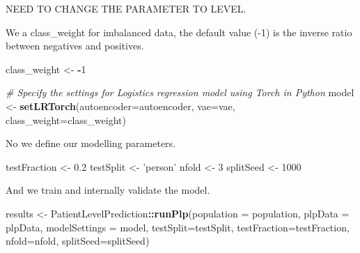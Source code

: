 \documentclass[]{article}
\newenvironment{Shaded}{\begin{snugshade}}{\end{snugshade}}
\newcommand{\KeywordTok}[1]{\textcolor[rgb]{0.13,0.29,0.53}{\textbf{#1}}}
\newcommand{\DataTypeTok}[1]{\textcolor[rgb]{0.13,0.29,0.53}{#1}}
\newcommand{\DecValTok}[1]{\textcolor[rgb]{0.00,0.00,0.81}{#1}}
\newcommand{\FloatTok}[1]{\textcolor[rgb]{0.00,0.00,0.81}{#1}}
\newcommand{\StringTok}[1]{\textcolor[rgb]{0.31,0.60,0.02}{#1}}
\newcommand{\CommentTok}[1]{\textcolor[rgb]{0.56,0.35,0.01}{\textit{#1}}}
\newcommand{\OperatorTok}[1]{\textcolor[rgb]{0.81,0.36,0.00}{\textbf{#1}}}
\newcommand{\NormalTok}[1]{#1}
\begin{document}
NEED TO CHANGE THE PARAMETER TO LEVEL.

We a class\_weight for imbalanced data, the default value (-1) is the
inverse ratio between negatives and positives.

\begin{Shaded}
\begin{Highlighting}[]
\NormalTok{class_weight <-}\StringTok{ }\OperatorTok{-}\DecValTok{1}
\end{Highlighting}
\end{Shaded}

\begin{Shaded}
\begin{Highlighting}[]
\CommentTok{# Specify the settings for Logistics regression model using Torch in Python}
\NormalTok{model <-}\StringTok{ }\KeywordTok{setLRTorch}\NormalTok{(}\DataTypeTok{autoencoder=}\NormalTok{autoencoder, }\DataTypeTok{vae=}\NormalTok{vae,  }\DataTypeTok{class_weight=}\NormalTok{class_weight)}
\end{Highlighting}
\end{Shaded}

No we define our modelling parameters.

\begin{Shaded}
\begin{Highlighting}[]
\NormalTok{testFraction <-}\StringTok{ }\FloatTok{0.2}
\NormalTok{testSplit <-}\StringTok{ 'person'}
\NormalTok{nfold <-}\StringTok{ }\DecValTok{3}
\NormalTok{splitSeed <-}\StringTok{ }\DecValTok{1000}
\end{Highlighting}
\end{Shaded}

And we train and internally validate the model.

\begin{Shaded}
\begin{Highlighting}[]
\NormalTok{results <-}\StringTok{ }\NormalTok{PatientLevelPrediction}\OperatorTok{::}\KeywordTok{runPlp}\NormalTok{(}\DataTypeTok{population =}\NormalTok{ population, }
                                          \DataTypeTok{plpData =}\NormalTok{ plpData, }
                                          \DataTypeTok{modelSettings =}\NormalTok{ model,}
                                          \DataTypeTok{testSplit=}\NormalTok{testSplit,}
                                          \DataTypeTok{testFraction=}\NormalTok{testFraction,}
                                          \DataTypeTok{nfold=}\NormalTok{nfold, }
                                          \DataTypeTok{splitSeed=}\NormalTok{splitSeed) }
\end{Highlighting}
\end{Shaded}
\end{document}
